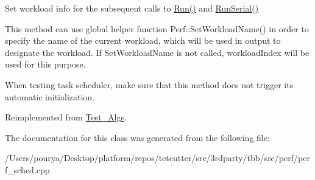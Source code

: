 Set workload info for the subsequent calls to \hyperlink{classTest__PFor_a14d67cebd4bca82da7d103686392618d}{Run()} and \hyperlink{classTest__PFor_ace2d473bba6b5c78861bec4b3167d7b6}{Run\+Serial()} 

This method can use global helper function Perf\+::\+Set\+Workload\+Name() in order to specify the name of the current workload, which will be used in output to designate the workload. If Set\+Workload\+Name is not called, workload\+Index will be used for this purpose.

When testing task scheduler, make sure that this method does not trigger its automatic initialization. 

Reimplemented from \hyperlink{classTest__Algs_a18ccd1cedb43cdbb4fce546a1abba490}{Test\+\_\+\+Algs}.



The documentation for this class was generated from the following file\+:\begin{DoxyCompactItemize}
\item 
/\+Users/pourya/\+Desktop/platform/repos/tetcutter/src/3rdparty/tbb/src/perf/perf\+\_\+sched.\+cpp\end{DoxyCompactItemize}
